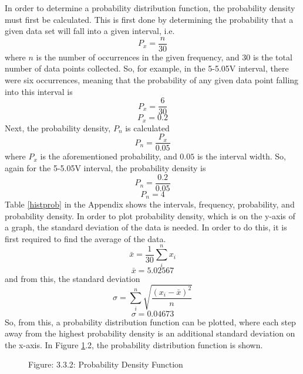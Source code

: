 \documentclass[a4,11pt]{article}
\begin{document}
In order to determine a probability distribution function, the probability density must first be calculated. This is first done by determining the probability that a given data set will fall into a given interval, i.e.
$$P_x=\frac{n}{30}$$
where $n$ is the number of occurrences in the given frequency, and $30$ is the total number of data points collected. So, for example, in the 5-5.05V interval, there were six occurrences, meaning that the probability of any given data point falling into this interval is
$$P_x=\frac{6}{30}$$
$$P_x=0.2$$
Next, the probability density, $P_n$ is calculated
$$P_n=\frac{P_x}{0.05}$$
where $P_x$ is the aforementioned probability, and $0.05$ is the interval width. So, again for the 5-5.05V interval, the probability density is
$$P_n=\frac{0.2}{0.05}$$
$$P_n=4$$
Table \ref{histprob} in the Appendix shows the intervals, frequency, probability, and probability density.
In order to plot probability density, which is on the y-axis of a graph, the standard deviation of the data is needed. In order to do this, it is first required to find the average of the data.
$$\bar{x}=\frac{1}{30}\sum_{i}^{n}{x_i}$$
$$\bar{x}=5.02567$$
and from this, the standard deviation
$$\sigma=\sum_{i}^n{\sqrt{\frac{(x_i-\bar x)^2}{n}}}$$
$$\sigma=0.04673$$
So, from this, a probability distribution function can be plotted, where each step away from the highest probability density is an additional standard deviation on the x-axis. In Figure \ref{fig:probdens}.2, the probability distribution function is shown.
\begin{figure}[H]
	\centering
	\label{fig:probdens}
	Figure: 3.3.2: Probability Density Function
\end{figure}
\end{document}
